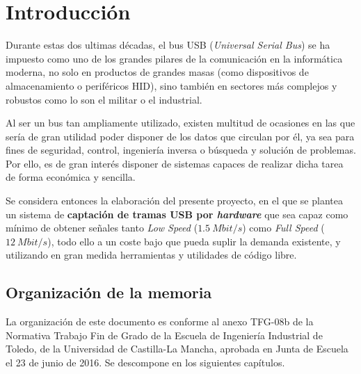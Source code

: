 \chapter{Introducción} 
\label{ch:introduccion}

Durante estas dos ultimas décadas, el bus USB\cite{craigpeacock2010} (\emph{Universal Serial Bus}) se ha impuesto como uno de los grandes pilares de la comunicación en la informática moderna, no solo en productos de grandes masas (como dispositivos de almacenamiento o periféricos HID\cite{usb:hid}), sino también en sectores más complejos y robustos como lo son el militar o el industrial.

Al ser un bus tan ampliamente utilizado, existen multitud de ocasiones en las que sería de gran utilidad poder disponer de los datos que circulan por él, ya sea para fines de seguridad\cite{NISSIM2017675}, control, ingeniería inversa o búsqueda y solución de problemas. Por ello, es de gran interés disponer de sistemas capaces de realizar dicha tarea de forma económica y sencilla.

Se considera entonces la elaboración del presente proyecto, en el que se plantea un sistema de \textbf{captación de tramas USB por \textit{hardware}} que sea capaz como mínimo de obtener señales tanto \textit{Low Speed} ($1.5~Mbit/s$) como \textit{Full Speed} ($12~Mbit/s$), todo ello a un coste bajo que pueda suplir la demanda existente, y utilizando en gran medida herramientas y utilidades de código libre.

\section{Organización de la memoria} 
La organización de este documento es conforme al anexo TFG-08b\cite{tfg08b} de la Normativa Trabajo Fin de Grado de la Escuela de Ingeniería Industrial de Toledo, de la Universidad de Castilla-La Mancha, aprobada en Junta de Escuela el 23 de junio de 2016. Se descompone en los siguientes capítulos.


